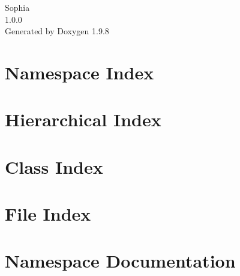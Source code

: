 \documentclass[twoside]{book}
\newcommand{\+}{\discretionary{\mbox{\scriptsize$\hookleftarrow$}}{}{}}
\newcommand{\clearemptydoublepage}{%
    \newpage{\pagestyle{empty}\cleardoublepage}%
  }
\begin{document}
  \raggedbottom
    \hypersetup{pageanchor=false,
                bookmarksnumbered=true,
                pdfencoding=unicode
               }
  \begin{titlepage}
  \vspace*{7cm}
  \begin{center}%
  {\Large Sophia}\\
  [1ex]\large 1.\+0.\+0 \\
  \vspace*{1cm}
  {\large Generated by Doxygen 1.9.8}\\
  \end{center}
  \end{titlepage}
  \clearemptydoublepage
  \tableofcontents
  \clearemptydoublepage
  \hypersetup{pageanchor=true}
\chapter{Namespace Index}

\chapter{Hierarchical Index}

\chapter{Class Index}

\chapter{File Index}

\chapter{Namespace Documentation}










\end{document}
